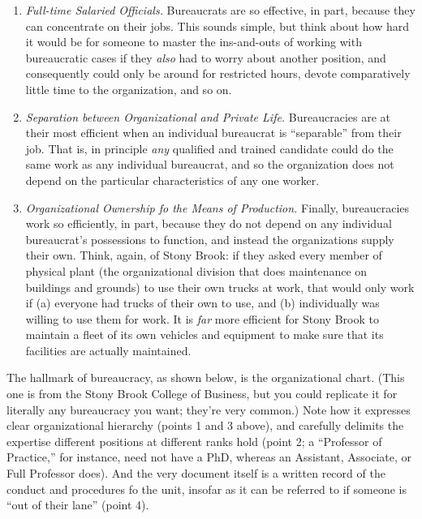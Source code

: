\documentclass[
  letterpaper,
  DIV=11,
  numbers=noendperiod,
  oneside]{scrartcl}
\begin{document}
\begin{enumerate}
  knowledge of the history of that case. On the other hand,
  bureaucracies often have extremely intricate written procedures for
  how officials themselves should go about their work, which means that,
  when they deviate from these prescribed norms of behavior, they can be
  held accountable.
\item
  \emph{Full-time Salaried Officials.} Bureaucrats are so effective, in
  part, because they can concentrate on their jobs. This sounds simple,
  but think about how hard it would be for someone to master the
  ins-and-outs of working with bureaucratic cases if they \emph{also}
  had to worry about another position, and consequently could only be
  around for restricted hours, devote comparatively little time to the
  organization, and so on.
\item
  \emph{Separation between Organizational and Private Life.}
  Bureaucracies are at their most efficient when an individual
  bureaucrat is ``separable'' from their job. That is, in principle
  \emph{any} qualified and trained candidate could do the same work as
  any individual bureaucrat, and so the organization does not depend on
  the particular characteristics of any one worker.
\item
  \emph{Organizational Ownership fo the Means of Production.} Finally,
  bureaucracies work so efficiently, in part, because they do not depend
  on any individual bureaucrat's possessions to function, and instead
  the organizations supply their own. Think, again, of Stony Brook: if
  they asked every member of physical plant (the organizational division
  that does maintenance on buildings and grounds) to use their own
  trucks at work, that would only work if (a) everyone had trucks of
  their own to use, and (b) individually was willing to use them for
  work. It is \emph{far} more efficient for Stony Brook to maintain a
  fleet of its own vehicles and equipment to make sure that its
  facilities are actually maintained.
\end{enumerate}

The hallmark of bureaucracy, as shown below, is the organizational
chart. (This one is from the Stony Brook College of Business, but you
could replicate it for literally any bureaucracy you want; they're very
common.) Note how it expresses clear organizational hierarchy (points 1
and 3 above), and carefully delimits the expertise different positions
at different ranks hold (point 2; a ``Professor of Practice,'' for
instance, need not have a PhD, whereas an Assistant, Associate, or Full
Professor does). And the very document itself is a written record of the
conduct and procedures fo the unit, insofar as it can be referred to if
someone is ``out of their lane'' (point 4).
\end{document}

